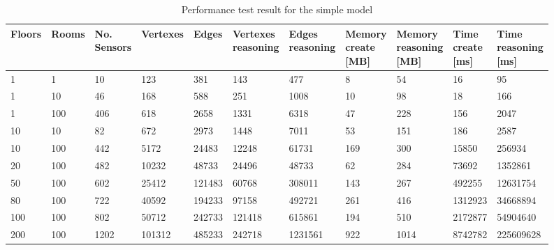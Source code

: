 \begin{table}
\centering
\caption{Performance test result for the simple model}
\label{tab:perf_simple}
\begin{adjustbox}{max width=\textwidth}
\begin{tabular}{lll|llll|llll}
\textbf{Floors} & \textbf{Rooms} & \specialcell{\textbf{No.}\\\textbf{Sensors}} & \textbf{Vertexes} & \textbf{Edges} & \specialcell{\textbf{Vertexes}\\\textbf{reasoning}} & \specialcell{\textbf{Edges}\\\textbf{reasoning}} & \specialcell{\textbf{Memory}\\\textbf{create}\\\textbf{{[}MB{]}}} & \specialcell{\textbf{Memory}\\\textbf{reasoning}\\\textbf{{[}MB{]}}} & \specialcell{\textbf{Time}\\\textbf{create}\\\textbf{{[}ms{]}}} & \specialcell{\textbf{Time}\\\textbf{reasoning}\\\textbf{{[}ms{]}}} \\\hline
1 & 1 & 10 & 123 & 381 & 143 & 477 & 8 & 54 & 16 & 95 \\
1 & 10 & 46 & 168 & 588 & 251 & 1008 & 10 & 98 & 18 & 166 \\
1 & 100 & 406 & 618 & 2658 & 1331 & 6318 & 47 & 228 & 156 & 2047 \\
10 & 10 & 82 & 672 & 2973 & 1448 & 7011 & 53 & 151 & 186 & 2587 \\
10 & 100 & 442 & 5172 & 24483 & 12248 & 61731 & 169 & 300 & 15850 & 256934 \\
20 & 100 & 482 & 10232 & 48733 & 24496 & 48733 & 62 & 284 & 73692 & 1352861 \\
50 & 100 & 602 & 25412 & 121483 & 60768 & 308011 & 143 & 267 & 492255 & 12631754 \\
80 & 100 & 722 & 40592 & 194233 & 97158 & 492721 & 261 & 416 & 1312923 & 34668894 \\
100 & 100 & 802 & 50712 & 242733 & 121418 & 615861 & 194 & 510 & 2172877 & 54904640 \\
200 & 100 & 1202 & 101312 & 485233 & 242718 & 1231561 & 922 & 1014 & 8742782 & 225609628
\end{tabular}
\end{adjustbox}
\end{table}
